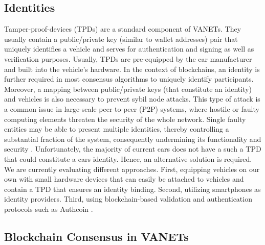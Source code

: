 \documentclass{llncs}
\begin{document}
{		%

		\subsection{Identities}
			\label{ss:identities}
		
			Tamper-proof-devices (TPDs) are a standard component of VANETs. They usually contain a public/private key (similar to wallet addresses) pair that uniquely identifies a vehicle and serves for authentication and signing as well as verification purposes. Usually, TPDs are pre-equipped by the car manufacturer and built into the vehicle's hardware. In the context of blockchains, an identity is further required in most consensus algorithms to uniquely identify participants. Moreover, a mapping between public/private keys (that constitute an identity) and vehicles is also necessary to prevent sybil node attacks. 
			This type of attack is a common issue in large-scale peer-to-peer (P2P) systems, where hostile or faulty computing elements threaten the security of the whole network. Single faulty entities may be able to present multiple identities, thereby controlling a substantial fraction of the system, consequently undermining its functionality and security \cite{douceur2002sybil}.	
			Unfortunately, the majority of current cars does not have a such a TPD that could constitute a cars identity. Hence, an alternative solution is required. We are currently evaluating different approaches. First, equipping vehicles on our own with small hardware devices that can easily be attached to vehicles and contain a TPD that ensures an identity binding. Second, utilizing smartphones as identity providers. Third, using blockchain-based validation and authentication protocols such as Authcoin  \cite{leiding2017securing}\cite{AuthcoinLeiding2016MCIS}\cite{leiding2017mapping}.
		

		\subsection{Blockchain Consensus in VANETs}
			\label{ss:consensus}
			
}
\end{document}
